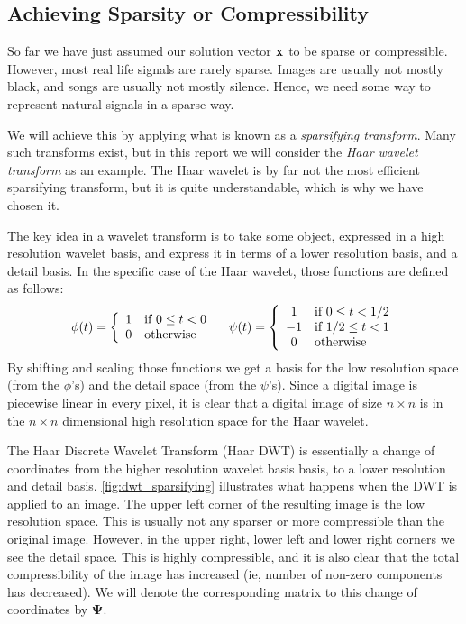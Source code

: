 \subsection{Achieving Sparsity or Compressibility}
So far we have just assumed our solution vector $ \mathbf{x} $ to be sparse or compressible. However, most real life signals are rarely sparse. Images are usually not mostly black, and songs are usually not mostly silence. Hence, we need some way to represent natural signals in a sparse way. 

We will achieve this by applying what is known as a \textit{sparsifying transform}. Many such transforms exist, but in this report we will consider the \textit{Haar wavelet transform} as an example. The Haar wavelet is by far not the most efficient sparsifying transform, but it is quite understandable, which is why we have chosen it. 

The key idea in a wavelet transform is to take some object, expressed in a high resolution wavelet basis, and express it in terms of a lower resolution basis, and a detail basis. In the specific case of the Haar wavelet, those functions are defined as follows:
\[
	\phi(t) = \left\{ \begin{array}{cl} 1 & \text{if } 0\leq t < 0 \\ 0 & \text{otherwise} \end{array} \right.
	\quad
	\psi(t) = \left\{ \begin{array}{cl} 1 & \text{if } 0\leq t < 1/2 \\ -1 & \text{if } 1/2 \leq t < 1 \\ 0 & \text{otherwise} \end{array} \right.
\]
By shifting and scaling those functions we get a basis for the low resolution space (from the $ \phi $'s) and the detail space (from the $ \psi $'s). Since a digital image is piecewise linear in every pixel, it is clear that a digital image of size $ n \times n $ is in the $ n \times n $ dimensional high resolution space for the Haar wavelet.

The Haar Discrete Wavelet Transform (Haar DWT) is essentially a change of coordinates from the higher resolution wavelet basis basis, to a lower resolution and detail basis. \cref{fig:dwt_sparsifying} illustrates what happens when the DWT is applied to an image. The upper left corner of the resulting image is the low resolution space. This is usually not any sparser or more compressible than the original image. However, in the upper right, lower left and lower right corners we see the detail space. This is highly compressible, and it is also clear that the total compressibility of the image has increased (ie, number of non-zero components has decreased). We will denote the corresponding matrix to this change of coordinates by $ \mathbf{\Psi} $. 

